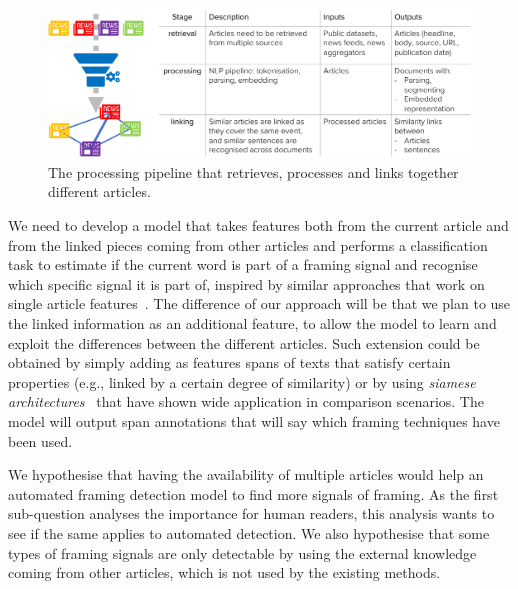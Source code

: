 \begin{figure}[!htb]
    \centering
    \includegraphics[width=\textwidth]{figures/figure_pipeline.pdf}
    \caption{The processing pipeline that retrieves, processes and links together different articles.}
    \label{fig:pipeline}
\end{figure}

We need to develop a model that takes features both from the current article and from the linked pieces coming from other articles and performs a classification task to estimate if the current word is part of a framing signal and recognise which specific signal it is part of, inspired by similar approaches that work on single article features~\cite{da2019fine}.
The difference of our approach will be that we plan to use the linked information as an additional feature, to allow the model to learn and exploit the differences between the different articles.
Such extension could be obtained by simply adding as features spans of texts that satisfy certain properties (e.g., linked by a certain degree of similarity) or by using \emph{siamese architectures}~\cite{bromley1994signature} that have shown wide application in comparison scenarios.
The model will output span annotations that will say which framing techniques have been used.


We hypothesise that having the availability of multiple articles would help an automated framing detection model to find more signals of framing.
As the first sub-question analyses the importance for human readers, this analysis wants to see if the same applies to automated detection.
We also hypothesise that some types of framing signals are only detectable by using the external knowledge coming from other articles, which is not used by the existing methods.


